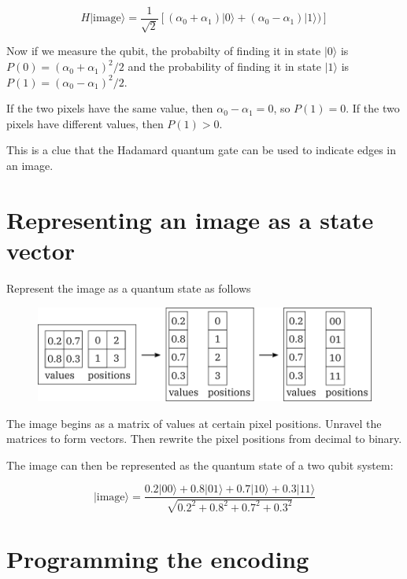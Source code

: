 \documentclass[11pt]{article}
\makeatletter
\def\maxwidth{\ifdim\Gin@nat@width>\linewidth\linewidth
    \else\Gin@nat@width\fi}
\let\Oldincludegraphics\includegraphics
\renewcommand{\includegraphics}[1]{\Oldincludegraphics[width=.8\maxwidth]{#1}}
\makeatother
\begin{document}
\[H|\textrm{image}\rangle =  \frac{1}{\sqrt{2}}\left[(\alpha_0 + \alpha_1)|0\rangle + (\alpha_0 - \alpha_1)|1\rangle)\right]\]

Now if we measure the qubit, the probabilty of finding it in state
\(|0\rangle\) is \(P(0) = (\alpha_0 + \alpha_1)^2/2\) and the
probability of finding it in state \(|1\rangle\) is
\(P(1) = (\alpha_0 - \alpha_1)^2/2\).

If the two pixels have the same value, then \(\alpha_0 - \alpha_1 = 0\),
so \(P(1) = 0\). If the two pixels have different values, then
\(P(1) > 0\).

This is a clue that the Hadamard quantum gate can be used to indicate
edges in an image.

    \hypertarget{representing-an-image-as-a-state-vector}{%
\section{Representing an image as a state
vector}\label{representing-an-image-as-a-state-vector}}

    Represent the image as a quantum state as follows

\begin{figure}[h]
\centering
\includegraphics{../img/quantum_encoding.png}
\end{figure}

    The image begins as a matrix of values at certain pixel positions.
Unravel the matrices to form vectors. Then rewrite the pixel positions
from decimal to binary.

The image can then be represented as the quantum state of a two qubit
system:

\[|\textrm{image}\rangle = \frac{0.2 |00\rangle + 0.8 |01\rangle + 0.7 |10\rangle + 0.3 |11\rangle}{\sqrt{0.2^2 + 0.8^2 + 0.7^2 + 0.3^2}}\]

    \hypertarget{programming-the-encoding}{%
\section{Programming the encoding}\label{programming-the-encoding}}
\end{document}
